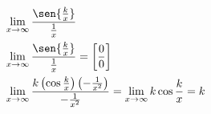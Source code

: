 \begin{ex}
\begin{align}
&\lim_{x\rightarrow \infty} \frac{\sen{\frac{k}{x}}}{\frac{1}{x}}\nonumber\\
&\lim_{x\rightarrow \infty} \frac{\sen{\frac{k}{x}}}{\frac{1}{x}}=\left[\frac{0}{0}\right]\nonumber\\
&\lim_{x\rightarrow \infty} \frac{k\left(\cos{\frac{k}{x}}\right)\left(-\frac{1}{x^2}\right)}{-\frac{1}{x^2}}=\lim_{x\rightarrow \infty} k\cos{\frac{k}{x}}=k\nonumber
\end{align}
\end{ex}